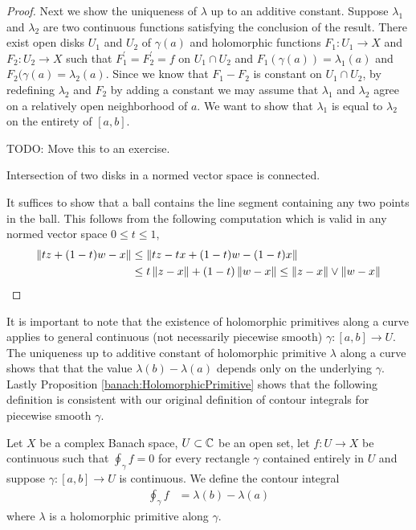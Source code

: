 \begin{proof}
Next we show the uniqueness of $\lambda$ up to an additive constant.   Suppose $\lambda_1$ and $\lambda_2$ are two continuous functions satisfying the conclusion of the result.   There exist open disks $U_1$ and $U_2$ of $\gamma(a)$ and holomorphic functions $F_1 : U_1 \to X$ and $F_2 : U_2 \to X$ such that $F_1^\prime = F_2^\prime = f$ on $U_1 \cap U_2$ and $F_1(\gamma(a)) = \lambda_1(a)$ and $F_2(\gamma(a)= \lambda_2(a)$.   Since we know that $F_1 - F_2$ is constant on $U_1 \cap U_2$, by redefining $\lambda_2$ and $F_2$ by adding a constant we may assume that $\lambda_1$ and $\lambda_2$ agree on a relatively open neighborhood of $a$.   We want to show that $\lambda_1$ is equal to $\lambda_2$ on the entirety of $[a,b]$.  

TODO: Move this to an exercise.
\begin{clm}Intersection of two disks in a normed vector space is connected.
\end{clm}
It suffices to show that a ball contains the line segment containing any two points in the ball.  This follows from the following computation which is valid in any normed vector space $0 \leq t \leq 1$,
\begin{align*}
  \left \lVert tz + (1-t) w - x \right \rVert &\leq \left \lVert tz - tx + (1-t) w - (1-t) x \right \rVert \\
  &\leq t \left \lVert z - x \right \rVert  + (1-t)\left \lVert w - x \right \rVert  \leq \left \lVert z - x \right \rVert \vee \left \lVert w - x \right \rVert
\end{align*}
\end{proof}

It is important to note that the existence of holomorphic primitives along a curve applies to general continuous (not necessarily piecewise smooth) $\gamma : [a,b] \to U$.
The uniqueness up to additive constant of holomorphic primitive $\lambda$ along a curve shows that that the value $\lambda(b) - \lambda(a)$ depends only on the underlying $\gamma$.   Lastly Proposition \ref{banach:HolomorphicPrimitive} shows that the following definition is consistent with our original definition of contour integrals for piecewise smooth $\gamma$.

\begin{defn}Let $X$ be a complex Banach space, $U \subset \mathbb{C}$ be an open set, let $f: U \to X$ be continuous such that $\oint_\gamma f = 0$ for every rectangle $\gamma$ contained entirely in $U$ and suppose $\gamma : [a,b] \to U$ is continuous.   We define the contour integral
  \begin{align*}
    \oint_{\gamma} f &= \lambda(b) - \lambda(a)
  \end{align*}
  where $\lambda$ is a holomorphic primitive along $\gamma$.
\end{defn}

